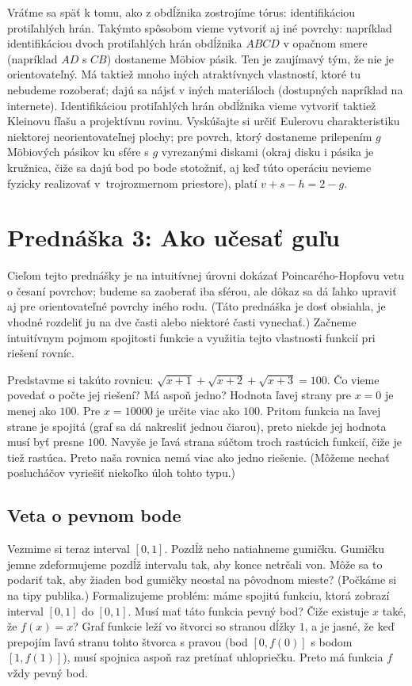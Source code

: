 \documentclass[a4paper]{article}
\begin{document}
Vráťme sa späť k tomu, ako z obdĺžnika zostrojíme tórus: identifikáciou protiľahlých hrán. Takýmto spôsobom vieme vytvoriť aj iné povrchy: napríklad identifikáciou dvoch protiľahlých hrán obdĺžnika $ABCD$ v opačnom smere (napríklad $AD$ s $CB$) dostaneme M\"obiov pásik. Ten je zaujímavý tým, že nie je orientovateľný. Má taktiež mnoho iných atraktívnych vlastností, ktoré tu nebudeme rozoberať; dajú sa nájsť v iných materiáloch (dostupných napríklad na internete). Identifikáciou protiľahlých hrán obdĺžnika vieme vytvoriť taktiež Kleinovu fľašu a projektívnu rovinu. Vyskúšajte si určiť Eulerovu charakteristiku niektorej neorientovateľnej plochy; pre povrch, ktorý dostaneme prilepením $g$ M\"obiových pásikov ku sfére s $g$ vyrezanými diskami (okraj disku i pásika je kružnica, čiže sa dajú bod po bode stotožniť, aj keď túto operáciu nevieme fyzicky realizovať v~trojrozmernom priestore), platí $v+s-h = 2-g$.


\section*{Prednáška 3: Ako učesať guľu}

Cieľom tejto prednášky je na intuitívnej úrovni dokázať Poincarého-Hopfovu vetu o česaní povrchov; budeme sa zaoberať iba sférou, ale dôkaz sa dá ľahko upraviť aj pre orientovateľné povrchy iného rodu. (Táto prednáška je dosť obsiahla, je vhodné rozdeliť ju na dve časti alebo niektoré časti vynechať.)
Začneme intuitívnym pojmom spojitosti funkcie a využitia tejto vlastnosti funkcií pri riešení rovníc.

Predstavme si takúto rovnicu: $\sqrt{x+1}+\sqrt{x+2}+\sqrt{x+3}=100$. Čo vieme povedať o počte jej riešení? Má aspoň jedno? Hodnota ľavej strany pre $x=0$ je menej ako $100$. Pre $x=10000$ je určite viac ako $100$. Pritom funkcia na ľavej strane je spojitá (graf sa dá nakresliť jednou čiarou), preto niekde jej hodnota musí byť presne $100$. Navyše je ľavá strana súčtom troch rastúcich funkcií, čiže je tiež rastúca. Preto naša rovnica nemá viac ako jedno riešenie. (Môžeme nechať poslucháčov vyriešiť niekoľko úloh tohto typu.)

\subsection*{Veta o pevnom bode}

Vezmime si teraz interval $[0,1]$. Pozdĺž neho natiahneme gumičku. Gumičku jemne zdeformujeme pozdĺž intervalu tak, aby konce netrčali von. Môže sa to podariť tak, aby žiaden bod gumičky neostal na pôvodnom mieste? (Počkáme si na tipy publika.) Formalizujeme problém: máme spojitú funkciu, ktorá zobrazí interval $[0,1]$ do $[0,1]$. Musí mať táto funkcia pevný bod? Čiže existuje $x$ také, že $f(x)=x$? Graf funkcie leží vo štvorci so stranou dĺžky $1$, a je jasné, že keď prepojím ľavú stranu tohto štvorca s pravou (bod $[0, f(0)]$ s bodom $[1,f(1)]$), musí spojnica aspoň raz pretínať uhlopriečku. Preto má funkcia $f$ vždy pevný bod.
\end{document}
